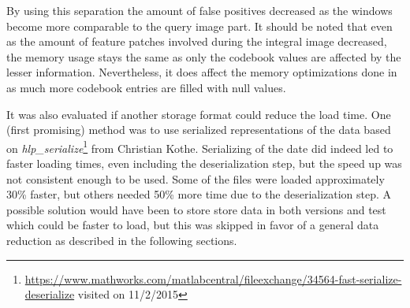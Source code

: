 By using this separation the amount of false positives decreased as the windows become more comparable to the query image part. It should be noted that even as the amount of feature patches involved during the integral image decreased, the memory usage stays the same as only the codebook values are affected by the lesser information. Nevertheless, it does affect the memory optimizations done in  as much more codebook entries are filled with null values.

It was also evaluated if another storage format could reduce the load time. One (first promising) method was to use serialized representations of the data based on \textit{hlp\_serialize}\footnote{\url{https://www.mathworks.com/matlabcentral/fileexchange/34564-fast-serialize-deserialize} visited on 11/2/2015} from Christian Kothe. Serializing of the date did indeed led to faster loading times, even including the deserialization step, but the speed up was not consistent enough to be used. Some of the files were loaded approximately 30\% faster, but others needed 50\% more time due to the deserialization step. A possible solution would have been to store store data in both versions and test which could be faster to load, but this was skipped in favor of a general data reduction as described in the following sections.
